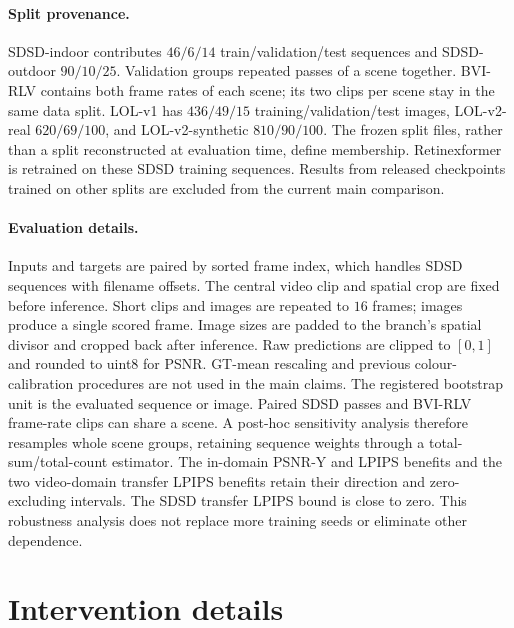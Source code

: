 \paragraph{Split provenance.}\label{app:membership}
SDSD-indoor contributes $46/6/14$ train/validation/test sequences and
SDSD-outdoor $90/10/25$.
Validation groups repeated passes of a scene together.
BVI-RLV contains both frame rates of each scene; its two clips per scene
stay in the same data split.
LOL-v1 has $436/49/15$ training/validation/test images,
LOL-v2-real $620/69/100$, and LOL-v2-synthetic $810/90/100$.
The frozen split files, rather than a split reconstructed at evaluation time,
define membership.
Retinexformer is retrained on these SDSD training sequences.
Results from released checkpoints trained on other splits are excluded from
the current main comparison.

\paragraph{Evaluation details.}
Inputs and targets are paired by sorted frame index, which handles SDSD
sequences with filename offsets.
The central video clip and spatial crop are fixed before inference.
Short clips and images are repeated to $16$ frames; images produce a single
scored frame.
Image sizes are padded to the branch's spatial divisor and cropped back
after inference.
Raw predictions are clipped to $[0,1]$ and rounded to uint8 for PSNR.
GT-mean rescaling and previous colour-calibration procedures are not used in
the main claims.
The registered bootstrap unit is the evaluated sequence or image.
Paired SDSD passes and BVI-RLV frame-rate clips can share a scene.
A post-hoc sensitivity analysis therefore resamples whole scene groups,
retaining sequence weights through a total-sum/total-count estimator.
The in-domain PSNR-Y and LPIPS benefits and the two video-domain transfer
LPIPS benefits retain their direction and zero-excluding intervals.
The SDSD transfer LPIPS bound is close to zero. This robustness analysis
does not replace more training seeds or eliminate other dependence.

\section{Intervention details}\label{app:interventions}

